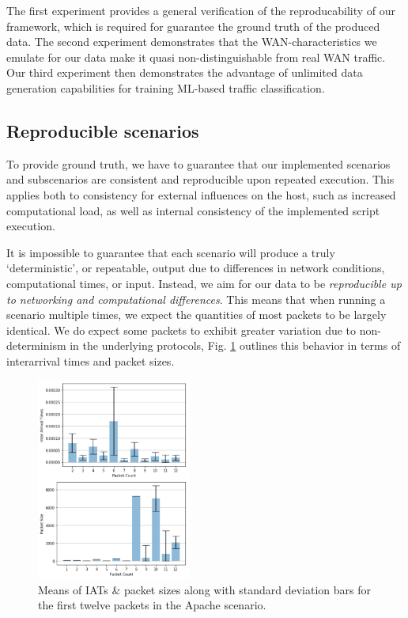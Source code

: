 \documentclass[sigconf]{acmart}
\begin{document}
The first experiment provides a general verification of the reproducability of our framework, which is required for guarantee the ground truth of the produced data. The second experiment demonstrates that the WAN-characteristics we emulate for our data make it quasi non-distinguishable from real WAN traffic. Our third experiment then demonstrates the advantage of unlimited data generation capabilities for training ML-based traffic classification.


\subsection{Reproducible scenarios}\label{Sec:deterministic}

To provide ground truth, we have to guarantee that our implemented scenarios and subscenarios are consistent and reproducible upon repeated execution. This applies both to consistency for external influences on the host, such as increased computational load, as well as internal consistency of the implemented script execution. 

It is impossible to guarantee that each scenario will produce a truly `deterministic', or repeatable, output due to differences in network conditions, computational times, or input. Instead, we aim for our data to be \textit{reproducible up to networking and computational differences}. This means that when running a scenario multiple times, we expect the quantities of most packets to be largely identical. We do expect some packets to exhibit greater variation due to non-determinism in the underlying protocols, Fig. \ref{fig:size1} outlines this behavior in terms of interarrival times and packet sizes. 

\begin{figure}
\includegraphics[width=0.45\textwidth]{images/combined3.png} %
\caption{Means of IATs \& packet sizes along with standard deviation bars for the first twelve packets in the Apache scenario.}
\label{fig:size1}
\end{figure}
\end{document}
